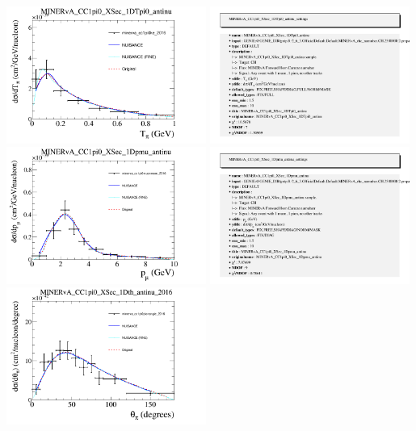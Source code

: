 \documentclass{article}
\begin{document}
\centering
\includegraphics[width=0.49\textwidth]{figures/minerva_cc1pi0ke_2016_comp.png}
\includegraphics[width=0.49\textwidth]{figures/minerva_cc1pi0ke_2016_info.png}
\centering
\includegraphics[width=0.49\textwidth]{figures/minerva_cc1pi0muonmom_2016_comp.png}
\includegraphics[width=0.49\textwidth]{figures/minerva_cc1pi0muonmom_2016_info.png}
\centering
\includegraphics[width=0.49\textwidth]{figures/minerva_cc1pi0pionangle_2016_comp.png}
\end{document}

